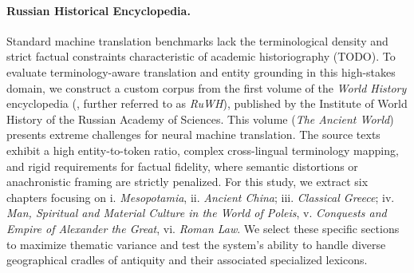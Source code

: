 \documentclass[11pt]{article}
\begin{document}
\paragraph{Russian Historical Encyclopedia.}
Standard machine translation benchmarks lack the terminological density and strict factual constraints characteristic of academic historiography (TODO). To evaluate terminology-aware translation and entity grounding in this high-stakes domain, we construct a custom corpus from the first volume of the \emph{World History} encyclopedia (\citet{chubarjan2019worldhistory1}, further referred to as \emph{RuWH}), published by the Institute of World History of the Russian Academy of Sciences. This volume (\emph{The Ancient World}) presents extreme challenges for neural machine translation. The source texts exhibit a high entity-to-token ratio, complex cross-lingual terminology mapping, and rigid requirements for factual fidelity, where semantic distortions or anachronistic framing are strictly penalized. For this study, we extract six chapters focusing on i. \emph{Mesopotamia}, ii. \emph{Ancient China}; iii. \emph{Classical Greece}; iv. \emph{Man, Spiritual and Material Culture in the World of Poleis}, v. \emph{Conquests and Empire of Alexander the Great}, vi. \emph{Roman Law}. We select these specific sections to maximize thematic variance and test the system's ability to handle diverse geographical cradles of antiquity and their associated specialized lexicons.


\end{document}
